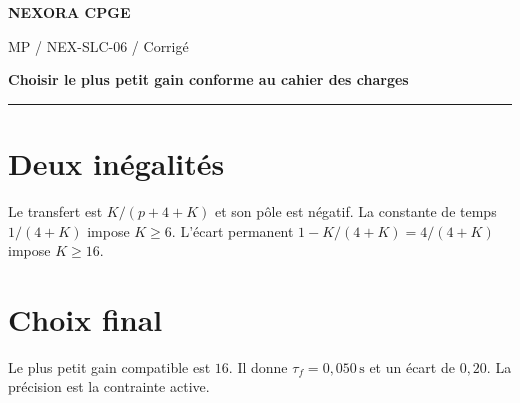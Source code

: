 \documentclass[11pt,a4paper]{article}
\begin{document}
{\small\bfseries\color{nexorablue} NEXORA CPGE}\par
{\small MP / NEX-SLC-06 / Corrigé}\par
{\LARGE\bfseries Choisir le plus petit gain conforme au cahier des charges}\par
\vspace{0.25em}\hrule\vspace{0.6em}

\section*{Deux inégalités}
Le transfert est $K/(p+4+K)$ et son pôle est négatif. La constante de temps $1/(4+K)$ impose $K\ge6$. L’écart permanent $1-K/(4+K)=4/(4+K)$ impose $K\ge16$.

\section*{Choix final}
Le plus petit gain compatible est $16$. Il donne $\tau_f=0{,}050\,\mathrm s$ et un écart de $0{,}20$. La précision est la contrainte active.
\end{document}
